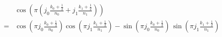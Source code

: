 \documentclass[a4paper, 12pt]{article}
\begin{document}
\begin{align*}
 ~& \cos \left( \pi \left( j_0 \frac{k_0 + \frac{1}{2}}{n_0} + j_1 \frac{k_1 + \frac{1}{2}}{n_1} \right)  \right) \\
 =&   \cos \left( \pi j_0 \frac{k_0 + \frac{1}{2}}{n_0} \right) \cos \left( \pi j_1 \frac{k_1 + \frac{1}{2}}{n_1} \right)
    - \sin \left( \pi j_0 \frac{k_0 + \frac{1}{2}}{n_0} \right) \, \sin \left( \pi j_1 \frac{k_1 + \frac{1}{2}}{n_1} \right)
\end{align*}
\end{document}
